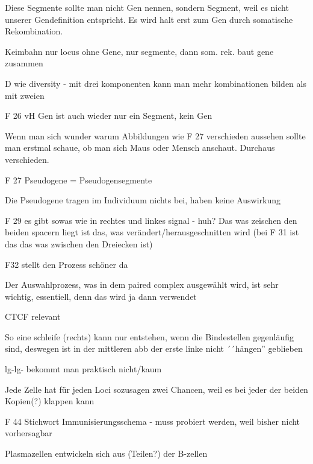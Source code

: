 Diese Segmente sollte man nicht Gen nennen, sondern Segment, weil es nicht unserer Gendefinition entspricht. Es wird
halt erst zum Gen durch somatische Rekombination.

Keimbahn nur locus ohne Gene, nur segmente, dann som. rek. baut gene zusammen



D wie diversity - mit drei komponenten kann man mehr kombinationen bilden als mit zweien

F 26 vH Gen ist auch wieder nur ein Segment, kein Gen

Wenn man sich wunder warum Abbildungen wie F 27 verschieden aussehen sollte man erstmal schaue, ob man sich Maus
oder Mensch anschaut.
Durchaus verschieden.

F 27 Pseudogene = Pseudogensegmente

Die Pseudogene tragen im Individuum nichts bei, haben keine Auswirkung

F 29 es gibt sowas wie in rechtes und linkes signal - huh?
Das was zeischen den beiden spacern liegt ist das, was verändert/herausgeschnitten wird  (bei F 31 ist das das was
zwischen den Dreiecken ist)


F32 stellt den Prozess schöner da

Der Auswahlprozess, was in dem paired complex ausgewählt wird, ist sehr wichtig, essentiell, denn das wird ja dann
verwendet

CTCF relevant

So eine schleife (rechts) kann nur entstehen, wenn die Bindestellen gegenläufig sind, deswegen ist in der mittleren
abb der erste linke nicht ´´hängen'' geblieben

lg-lg- bekommt man praktisch nicht/kaum

Jede Zelle hat für jeden Loci sozusagen zwei Chancen, weil es bei jeder der beiden Kopien(?) klappen kann



F 44 Stichwort Immunisierungsschema - muss probiert werden, weil bisher nicht vorhersagbar

Plasmazellen entwickeln sich aus (Teilen?) der B-zellen

